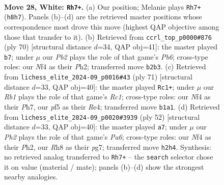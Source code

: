 \documentclass[11pt]{article}
\begin{document}
\clearpage

\begin{figure}[p]\centering
\begin{subfigure}{0.46\textwidth}\centering
\resizebox{\linewidth}{!}{%
\newchessgame
\chessboard[
  setfen={7R/pppk4/8/5p2/4pN2/8/PPr2r1P/1R2K3 w - - 0 28},
  showmover=false,
  pgfstyle=straightmove, color=movearrow, markmove={h8-h7}
]}
\caption{}
\end{subfigure}\hfill
\begin{subfigure}{0.46\textwidth}\centering
\resizebox{\linewidth}{!}{%
\newchessgame
\chessboard[
  setfen={6k1/R4p1p/1P4p1/8/3P4/6P1/1r3r1P/3R2K1 w - - 0 36},
  showmover=false,
  pgfstyle=straightmove, color=movearrow, markmove={b6-b7}
]}
\caption{}
\end{subfigure}
\\[4pt]
\begin{subfigure}{0.46\textwidth}\centering
\resizebox{\linewidth}{!}{%
\newchessgame
\chessboard[
  setfen={2r3k1/R4R1p/1p6/3p2P1/4r3/4n1B1/P6P/7K b - - 2 36},
  showmover=false,
  pgfstyle=straightmove, color=movearrow, markmove={c8-c1}
]}
\caption{}
\end{subfigure}\hfill
\begin{subfigure}{0.46\textwidth}\centering
\resizebox{\linewidth}{!}{%
\newchessgame
\chessboard[
  setfen={R7/2p2ppk/P7/2P4p/8/6P1/1r3r1P/R5K1 w - - 0 27},
  showmover=false,
  pgfstyle=straightmove, color=movearrow, markmove={a6-a7}
]}
\caption{}
\end{subfigure}
\caption{\textbf{Move 28, White: \texttt{Rh7+}.} (a) Our position; Melanie plays \texttt{Rh7+} (\texttt{h8h7}). Panels (b)--(d) are the retrieved master positions whose correspondence most drove this move (highest QAP objective among those that transfer to it). (b) Retrieved from \texttt{ccrl\_top\_p0000\#876} (ply 70) [structural distance $d$=34, QAP obj=41]: the master played \texttt{b7}; under $\mu$ our \emph{Pb2} plays the role of that game's \emph{Pb6}; cross-type roles: our \emph{N}f4 as their \emph{P}h2; transferred move \texttt{b2b3}. (c) Retrieved from \texttt{lichess\_elite\_2024-09\_p0016\#43} (ply 71) [structural distance $d$=33, QAP obj=40]: the master played \texttt{Rc1+}; under $\mu$ our \emph{Rb1} plays the role of that game's \emph{Rc1}; cross-type roles: our \emph{N}f4 as their \emph{P}h7, our \emph{p}f5 as their \emph{R}e4; transferred move \texttt{b1a1}. (d) Retrieved from \texttt{lichess\_elite\_2024-09\_p0020\#3939} (ply 52) [structural distance $d$=33, QAP obj=40]: the master played \texttt{a7}; under $\mu$ our \emph{Ph2} plays the role of that game's \emph{Pa6}; cross-type roles: our \emph{N}f4 as their \emph{P}h2, our \emph{R}h8 as their \emph{p}g7; transferred move \texttt{h2h4}. Synthesis: no retrieved analog transferred to \texttt{Rh7+} -- the \texttt{search} selector chose it on value (material / mate); panels (b)--(d) show the strongest nearby analogies.}
\label{fig:thought-m54}
\end{figure}
\end{document}
